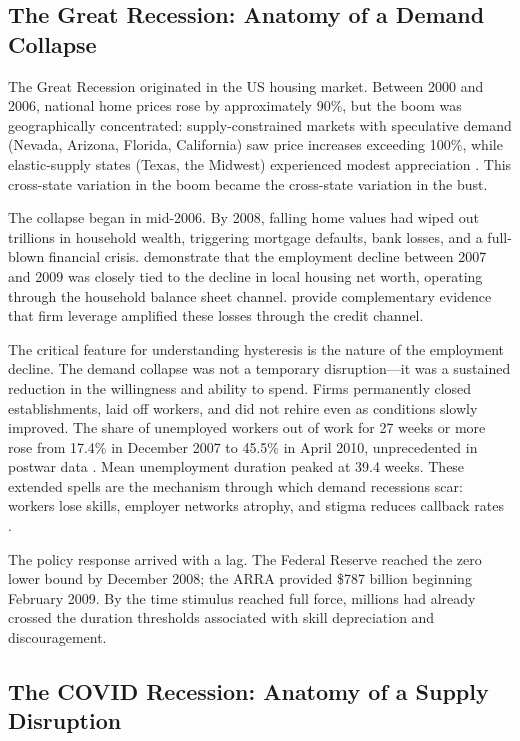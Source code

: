 \documentclass[12pt]{article}
\begin{document}
\subsection{The Great Recession: Anatomy of a Demand Collapse}

The Great Recession originated in the US housing market. Between 2000 and 2006, national home prices rose by approximately 90\%, but the boom was geographically concentrated: supply-constrained markets with speculative demand (Nevada, Arizona, Florida, California) saw price increases exceeding 100\%, while elastic-supply states (Texas, the Midwest) experienced modest appreciation \citep{mian2013household, glaeser2017housing, saiz2010geographic}. This cross-state variation in the boom became the cross-state variation in the bust.

The collapse began in mid-2006. By 2008, falling home values had wiped out trillions in household wealth, triggering mortgage defaults, bank losses, and a full-blown financial crisis. \citet{mian2014explains} demonstrate that the employment decline between 2007 and 2009 was closely tied to the decline in local housing net worth, operating through the household balance sheet channel. \citet{giroud2017firm} provide complementary evidence that firm leverage amplified these losses through the credit channel.

The critical feature for understanding hysteresis is the nature of the employment decline. The demand collapse was not a temporary disruption---it was a sustained reduction in the willingness and ability to spend. Firms permanently closed establishments, laid off workers, and did not rehire even as conditions slowly improved. The share of unemployed workers out of work for 27 weeks or more rose from 17.4\% in December 2007 to 45.5\% in April 2010, unprecedented in postwar data \citep{kroft2016long}. Mean unemployment duration peaked at 39.4 weeks. These extended spells are the mechanism through which demand recessions scar: workers lose skills, employer networks atrophy, and stigma reduces callback rates \citep{kroft2016long, elsby2010labor}.

The policy response arrived with a lag. The Federal Reserve reached the zero lower bound by December 2008; the ARRA provided \$787 billion beginning February 2009. By the time stimulus reached full force, millions had already crossed the duration thresholds associated with skill depreciation and discouragement.

\subsection{The COVID Recession: Anatomy of a Supply Disruption}
\end{document}
